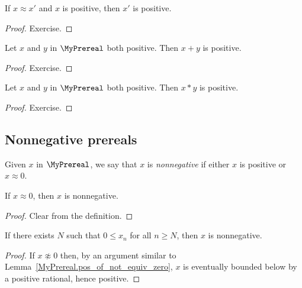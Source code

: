 \begin{lemma}
    \label{MyPrereal.isPos_quotient}
    \leanok
    If $x \approx x'$ and $x$ is positive, then $x'$ is positive.
\end{lemma}
\begin{proof}
    \leanok
    Exercise.
\end{proof}

\begin{lemma}
    \label{MyPrereal.IsPos.add}
    \leanok
    Let $x$ and $y$ in $\MyPrereal$ both positive. Then $x + y$ is positive.
\end{lemma}
\begin{proof}
    \leanok
    Exercise.
\end{proof}

\begin{lemma}
    \label{MyPrereal.IsPos.mul}
    \leanok
    Let $x$ and $y$ in $\MyPrereal$ both positive. Then $x * y$ is positive.
\end{lemma}
\begin{proof}
    \leanok
    Exercise.
\end{proof}

\subsection{Nonnegative prereals}

\begin{definition}
    \label{MyPrereal.IsNonneg}
    \leanok
Given $x$ in $\MyPrereal$, we say that $x$ is \emph{nonnegative} if either $x$ is positive or $x
\approx 0$.
\end{definition}

\begin{lemma}
    \label{MyPrereal.IsNonneg_of_equiv_zero}
    \leanok
    If $x \approx 0$, then $x$ is nonnegative.
\end{lemma}
\begin{proof}
    \leanok
    Clear from the definition.
\end{proof}

\begin{lemma}
    \label{MyPrereal.IsNonneg_of_nonneg}
    \leanok
    If there exists $N$ such that $0 \leq x_n$ for all $n \geq N$, then $x$ is nonnegative.
\end{lemma}
\begin{proof}
    \leanok
    If $x \not\approx 0$ then, by an argument similar to
    Lemma~\ref{MyPrereal.pos_of_not_equiv_zero}, $x$ is eventually bounded below by a positive
    rational, hence positive.
\end{proof}

